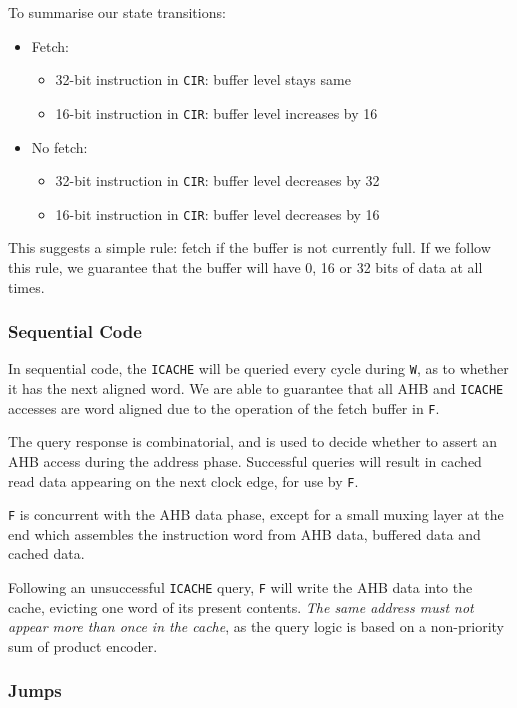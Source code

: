 \documentclass{article}
\begin{document}
To summarise our state transitions:

\begin{itemize}
\item Fetch:
	\begin{itemize}
	\item 32-bit instruction in \texttt{CIR}: buffer level stays same
	\item 16-bit instruction in \texttt{CIR}: buffer level increases by 16
	\end{itemize}
\item No fetch:
	\begin{itemize}
	\item 32-bit instruction in \texttt{CIR}: buffer level decreases by 32
	\item 16-bit instruction in \texttt{CIR}: buffer level decreases by 16
	\end{itemize}
\end{itemize}

This suggests a simple rule: fetch if the buffer is not currently full. If we follow this rule, we guarantee that the buffer will have 0, 16 or 32 bits of data at all times.

\subsubsection{Sequential Code}

In sequential code, the \texttt{ICACHE} will be queried every cycle during \texttt{W}, as to whether it has the next aligned word. We are able to guarantee that all AHB and \texttt{ICACHE} accesses are word aligned due to the operation of the fetch buffer in \texttt{F}.

The query response is combinatorial, and is used to decide whether to assert an AHB access during the address phase. Successful queries will result in cached read data appearing on the next clock edge, for use by \texttt{F}.

\texttt{F} is concurrent with the AHB data phase, except for a small muxing layer at the end which assembles the instruction word from AHB data, buffered data and cached data.

Following an unsuccessful \texttt{ICACHE} query, \texttt{F} will write the AHB data into the cache, evicting one word of its present contents. \textit{The same address must not appear more than once in the cache}, as the query logic is based on a non-priority sum of product encoder.


\subsubsection{Jumps}
\end{document}
